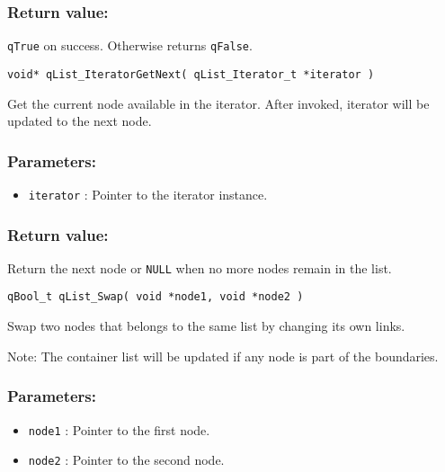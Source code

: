 \subsubsection*{Return value:}
\lstinline{qTrue} on success. Otherwise returns \lstinline{qFalse}. 

\noindent\hrulefill

\begin{lstlisting}[style=CStyle]
void* qList_IteratorGetNext( qList_Iterator_t *iterator )
\end{lstlisting} 

Get the current node available in the iterator. After invoked, iterator will be updated to the next node.

\subsubsection*{Parameters:}
\begin{itemize}
    \item \lstinline{iterator} : Pointer to the iterator instance. 
\end{itemize}

\subsubsection*{Return value:}
Return the next node or \lstinline{NULL} when no more nodes remain in the list. 

\noindent\hrulefill

\begin{lstlisting}[style=CStyle]
qBool_t qList_Swap( void *node1, void *node2 )
\end{lstlisting} 

Swap two nodes that belongs to the same list by changing its own links.

Note: The container list will be updated if any node is part of the boundaries.

\subsubsection*{Parameters:}
\begin{itemize}
    \item \lstinline{node1} : Pointer to the first node.
    \item \lstinline{node2} : Pointer to the second node.
\end{itemize}

